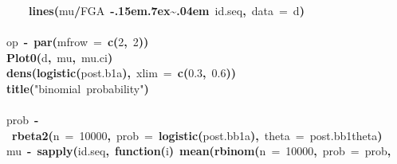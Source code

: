 \documentclass{article}
\makeatletter
\newcommand{\hlnumber}[1]{\textcolor[rgb]{0,0,0}{#1}}%
\newcommand{\hlfunctioncall}[1]{\textcolor[rgb]{.5,0,.33}{\textbf{#1}}}%
\newcommand{\hlstring}[1]{\textcolor[rgb]{.6,.6,1}{#1}}%
\newcommand{\hlkeyword}[1]{\textbf{#1}}%
\newcommand{\hlargument}[1]{\textcolor[rgb]{.69,.25,.02}{#1}}%
\newcommand{\hlformalargs}[1]{\hlargument{#1}}%
\newcommand{\hlassignement}[1]{\textbf{#1}}%
\newcommand{\hlsymbol}[1]{#1}%
\def\urltilda{\kern -.15em\lower .7ex\hbox{\~{}}\kern .04em}%
\newcommand{\hlstd}[1]{\textcolor[rgb]{0,0,0}{#1}}%
\newenvironment{kframe}{%
 \def\FrameCommand##1{\hskip\@totalleftmargin \hskip-\fboxsep
 \colorbox{shadecolor}{##1}\hskip-\fboxsep
     \hskip-\linewidth \hskip-\@totalleftmargin \hskip\columnwidth}%
 \MakeFramed {\advance\hsize-\width
   \@totalleftmargin\z@ \linewidth\hsize
   \@setminipage}}%
 {\par\unskip\endMakeFramed}
\newenvironment{knitrout}{}{} %
\makeatother
\begin{document}
\begin{knitrout}
{\begin{kframe}
\begin{flushleft}
\hlstd{}{\ }{\ }{\ }{\ }\hlfunctioncall{lines}\hlkeyword{(}\hlsymbol{mu}\hlkeyword{/}\hlsymbol{FGA}{\ }\hlkeyword{\urltilda{}}{\ }\hlsymbol{id.seq}\hlkeyword{,}{\ }\hlargument{data}{\ }\hlargument{=}{\ }\hlsymbol{d}\hlkeyword{)}\hspace*{\fill}\\
\hlstd{}\hlkeyword{\usebox{\hlnormalsizeboxclosebrace}}\hspace*{\fill}\\
\hlstd{}\hlsymbol{op}{\ }\hlassignement{\usebox{\hlnormalsizeboxlessthan}-}{\ }\hlfunctioncall{par}\hlkeyword{(}\hlargument{mfrow}{\ }\hlargument{=}{\ }\hlfunctioncall{c}\hlkeyword{(}\hlnumber{2}\hlkeyword{,}{\ }\hlnumber{2}\hlkeyword{)}\hlkeyword{)}\hspace*{\fill}\\
\hlstd{}\hlfunctioncall{Plot0}\hlkeyword{(}\hlsymbol{d}\hlkeyword{,}{\ }\hlsymbol{mu}\hlkeyword{,}{\ }\hlsymbol{mu.ci}\hlkeyword{)}\hspace*{\fill}\\
\hlstd{}\hlfunctioncall{dens}\hlkeyword{(}\hlfunctioncall{logistic}\hlkeyword{(}\hlsymbol{post.b1}\hlkeyword{\usebox{\hlnormalsizeboxdollar}}\hlsymbol{a}\hlkeyword{)}\hlkeyword{,}{\ }\hlargument{xlim}{\ }\hlargument{=}{\ }\hlfunctioncall{c}\hlkeyword{(}\hlnumber{0.3}\hlkeyword{,}{\ }\hlnumber{0.6}\hlkeyword{)}\hlkeyword{)}\hspace*{\fill}\\
\hlstd{}\hlfunctioncall{title}\hlkeyword{(}\hlstring{"binomial{\ }probability"}\hlkeyword{)}\hspace*{\fill}\\
\hlstd{}\hspace*{\fill}\\
\hlstd{}\hlsymbol{prob}{\ }\hlassignement{\usebox{\hlnormalsizeboxlessthan}-}{\ }\hlfunctioncall{rbeta2}\hlkeyword{(}\hlargument{n}{\ }\hlargument{=}{\ }\hlnumber{10000}\hlkeyword{,}{\ }\hlargument{prob}{\ }\hlargument{=}{\ }\hlfunctioncall{logistic}\hlkeyword{(}\hlsymbol{post.bb1}\hlkeyword{\usebox{\hlnormalsizeboxdollar}}\hlsymbol{a}\hlkeyword{)}\hlkeyword{,}{\ }\hlargument{theta}{\ }\hlargument{=}{\ }\hlsymbol{post.bb1}\hlkeyword{\usebox{\hlnormalsizeboxdollar}}\hlsymbol{theta}\hlkeyword{)}\hspace*{\fill}\\
\hlstd{}\hlsymbol{mu}{\ }\hlassignement{\usebox{\hlnormalsizeboxlessthan}-}{\ }\hlfunctioncall{sapply}\hlkeyword{(}\hlsymbol{id.seq}\hlkeyword{,}{\ }\hlkeyword{function}\hlkeyword{(}\hlformalargs{i}\hlkeyword{)}{\ }\hlfunctioncall{mean}\hlkeyword{(}\hlfunctioncall{rbinom}\hlkeyword{(}\hlargument{n}{\ }\hlargument{=}{\ }\hlnumber{10000}\hlkeyword{,}{\ }\hlargument{prob}{\ }\hlargument{=}{\ }\hlsymbol{prob}\hlkeyword{,}\hspace*{\fill}\\

\end{flushleft}
\end{kframe}}
\end{knitrout}
\end{document}
